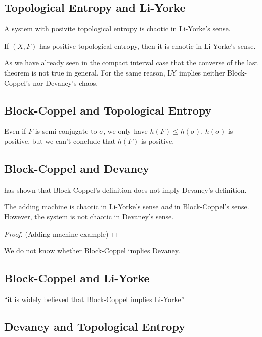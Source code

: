 \documentclass[12pt,twoside,draft]{book}
\begin{document}
\subsection*{Topological Entropy and Li-Yorke}
A system with posivite topological entropy is chaotic in Li-Yorke's sense.
\begin{theorem}
  \citep{blanchard}
  If $(X,F)$ has positive topological entropy, then it is chaotic in Li-Yorke's sense.
  \label{thm:entropy-liyorke}
\end{theorem}
As we have already seen in the compact interval case that the converse of the last theorem is not true in general.
For the same reason, LY implies neither Block-Coppel's nor Devaney's chaos.

\subsection*{Block-Coppel and Topological Entropy}
Even if $F$ is semi-conjugate to $\sigma$, we only have $h(F) \leq h(\sigma)$.
$h(\sigma)$ is positive, but we can't conclude that $h(F)$ is positive.

\subsection*{Block-Coppel and Devaney}
\citet{aulbach} has shown that Block-Coppel's definition does not imply Devaney's definition.
\begin{theorem}
  \citep{aulbach} 
  The adding machine is chaotic in Li-Yorke's sense \textit{and} in Block-Coppel's sense.
  However, the system is not chaotic in Devaney's sense.
  \begin{proof}
    (Adding machine example)
  \end{proof}
\end{theorem}
We do not know whether Block-Coppel implies Devaney.

\subsection*{Block-Coppel and Li-Yorke}
``it is widely believed that Block-Coppel implies Li-Yorke''

\subsection*{Devaney and Topological Entropy}
\end{document}
